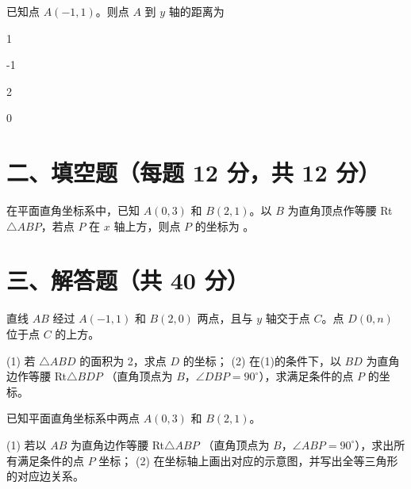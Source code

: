 \documentclass{exam-zh}
\newcommand{\answerarea}[1][40mm]{%
  \vspace{2mm}%
  \begin{tcolorbox}[
    enhanced, breakable,
    colback=white,
    colframe=white,
    boxrule=0pt,
    height=#1,
    valign=top,
    bottom=0mm,
    after skip=0mm,
  ]
  \end{tcolorbox}%
}
\begin{document}
\begin{question}[points=12]
  已知点 $A(-1, 1)$。则点 $A$ 到 $y$ 轴的距离为
  \begin{choices}
    \item 1
    \item -1
    \item 2
    \item 0
  \end{choices}
\end{question}


\section*{二、填空题（每题 12 分，共 12 分）}


\begin{question}[points=12]
  在平面直角坐标系中，已知 $A(0, 3)$ 和 $B(2, 1)$。以 $B$ 为直角顶点作等腰 Rt$\triangle ABP$，若点 $P$ 在 $x$ 轴上方，则点 $P$ 的坐标为 \fillin。
\end{question}


\section*{三、解答题（共 40 分）}


\begin{problem}[points=20]
  直线 $AB$ 经过 $A(-1, 1)$ 和 $B(2, 0)$ 两点，且与 $y$ 轴交于点 $C$。点 $D(0, n)$ 位于点 $C$ 的上方。

(1) 若 $\triangle ABD$ 的面积为 2，求点 $D$ 的坐标；
(2) 在(1)的条件下，以 $BD$ 为直角边作等腰 Rt$\triangle BDP$ （直角顶点为 $B$，$\angle DBP = 90^\circ$），求满足条件的点 $P$ 的坐标。
  \answerarea[65mm]
\end{problem}



\begin{problem}[points=20]
  已知平面直角坐标系中两点 $A(0, 3)$ 和 $B(2, 1)$。

(1) 若以 $AB$ 为直角边作等腰 Rt$\triangle ABP$ （直角顶点为 $B$，$\angle ABP = 90^\circ$），求出所有满足条件的点 $P$ 坐标；
(2) 在坐标轴上画出对应的示意图，并写出全等三角形的对应边关系。
  \answerarea[60mm]
\end{problem}
\end{document}
